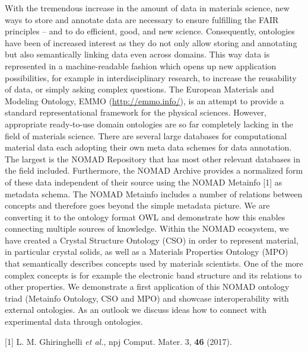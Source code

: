 \documentclass{article}
\begin{document}
With the tremendous increase in the amount of data in materials science, new ways to store and annotate data are necessary to ensure fulfilling the FAIR principles -- and to do efficient, good, and new science. Consequently, ontologies have been of increased interest as they do not only allow storing and annotating but also semantically linking data even across domains. 
This way data is represented in a machine-readable fashion which opens up new application possibilities, for example in interdisciplinary research, to increase the reusability of data, or simply asking complex questions.
The European Materials and Modeling Ontology, EMMO (\url{http://emmo.info/}), is an attempt to provide a standard representational framework for the physical sciences. However, appropriate ready-to-use domain ontologies are so far completely lacking in the field of materials science. There are several large databases for computational material data each adopting their own meta data schemes for data annotation. The largest is the NOMAD Repository that has most other relevant databases in the field included.
Furthermore, the NOMAD Archive provides a normalized form of these data independent of their source using the NOMAD Metainfo [1] as metadata schema. The NOMAD Metainfo includes a number of relations between concepts and therefore goes beyond the simple metadata picture. We are converting it to the ontology format OWL and demonstrate how this enables connecting multiple sources of knowledge.
Within the NOMAD ecosystem, we have created a Crystal Structure Ontology (CSO) in order to represent material, in particular crystal solids, as well as a Materials Properties Ontology (MPO) that semantically describes concepts used by materials scientists. One of the more complex concepts is for example the electronic band structure and its relations to other properties.
We demonstrate a first application of this NOMAD ontology triad (Metainfo Ontology, CSO and MPO) and showcase interoperability with external ontologies.
As an outlook we discuss ideas how to connect with experimental data through ontologies.


\vskip 1cm
[1] L. M. Ghiringhelli {\it et al.}, npj Comput. Mater. 3, {\bf 46} (2017).
\end{document}
